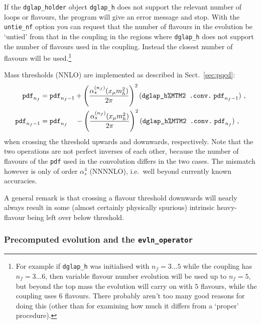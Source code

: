 \documentclass[12pt]{article}
\newcommand{\as}{\alpha_s}
\newcommand{\ie}{i.e.\ }
\newcommand{\ttt}[1]{\texttt{#1}}
\begin{document}
If the \ttt{dglap\_holder} object \ttt{dglap\_h} does not support the
relevant number of loops or flavours, the program will give an error
message and stop. With the \ttt{untie\_nf} option you can request that
the number of flavours in the evolution be `untied' from that in the
coupling in the regions where \ttt{dglap\_h} does not support the number of
flavours used in the coupling. Instead the closest number of flavours
will be used.\footnote{For example if \ttt{dglap\_h} was initialised with
  $n_f = 3\ldots5$ while the coupling has $n_f = 3\ldots 6$, then
  variable flavour number evolution will be used up to $n_f = 5$, but
  beyond the top mass the evolution will carry on with $5$ flavours,
  while the coupling uses $6$ flavours. There probably aren't too many
  good reasons for doing this (other than for examining how much it
  differs from a `proper' procedure).}

Mass thresholds (NNLO) are implemented as described in
Sect.~\ref{sec:pqcd}:
\begin{subequations}
\label{eq:mass_threshold}
\begin{align}
  \ttt{pdf}_{n_f} &= \ttt{pdf}_{n_f-1} +
  \left(\frac{\alpha_{s}^{(n_f)}(x_\mu m_h^2)}{2\pi}\right)^2
  (\mbox{\ttt{dglap\_h\%MTM2 .conv.}}\; \ttt{pdf}_{n_f-1}) \ ,\\
  \ttt{pdf}_{n_f-1} &= \ttt{pdf}_{n_f} \;\;\;\;-
  \left(\frac{\alpha_{s}^{(n_f)}(x_\mu m_h^2)}{2\pi}\right)^2
  (\mbox{\ttt{dglap\_h\%MTM2 .conv.}}\; \ttt{pdf}_{n_f}) \ ,
\end{align}
\end{subequations}
when crossing the threshold upwards and downwards, respectively. Note
that the two operations are not perfect inverses of each other,
because the number of flavours of the \ttt{pdf} used in the
convolution differs in the two cases. The mismatch however is only of
order $\as^4$ (NNNNLO), \ie well beyond currently known accuracies.

A general remark is that crossing a flavour threshold downwards will
nearly always result in some (almost certainly physically spurious)
intrinsic heavy-flavour being left over below threshold.

\subsubsection{Precomputed evolution and the \ttt{evln\_operator}}
\label{sec:precomputed-evolution}
\end{document}
